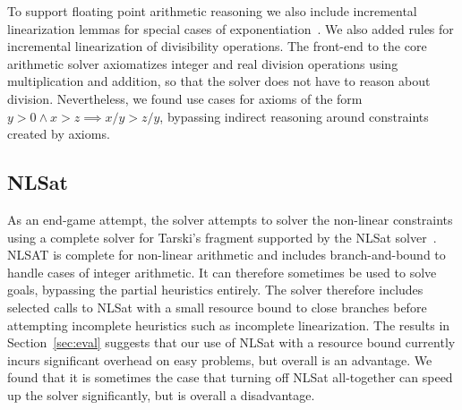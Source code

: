 To support floating point arithmetic reasoning
we also include incremental linearization lemmas for special
cases of exponentiation~\cite{DBLP:journals/tocl/CimattiGIRS18}. 
We also added rules for incremental linearization of divisibility operations. 
The front-end to the core arithmetic solver axiomatizes integer and real division operations using multiplication and addition,
so that the solver does not have to reason about division. Nevertheless, we found use cases for
axioms of the form $y > 0 \land x > z \implies x/y > z/y$, bypassing indirect reasoning around constraints created by axioms.



\subsection{NLSat}
As an end-game attempt, the solver attempts to solver the non-linear constraints using a complete solver
for Tarski's fragment supported by the NLSat solver~\cite{JovanovicM12}. NLSAT is complete for non-linear arithmetic
and includes branch-and-bound to handle cases of integer arithmetic. It can therefore sometimes be used to solve
goals, bypassing the partial heuristics entirely. The solver therefore includes selected calls to NLSat with a small
resource bound to close branches before attempting incomplete heuristics such as incomplete linearization.
The results in Section~\ref{sec:eval} suggests that our use of NLSat with a resource bound currently incurs
significant overhead on easy problems, but overall is an advantage. We found that it is sometimes the case that turning off NLSat
all-together can speed up the solver significantly, but is overall a disadvantage.

